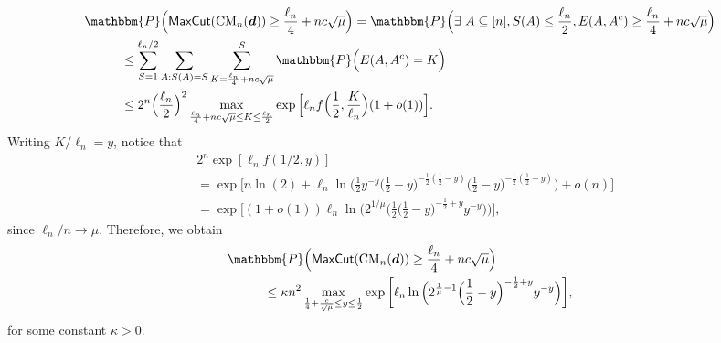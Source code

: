 \documentclass[11pt,a4paper, reqno]{article}
\numberwithin{equation}{section}
\numberwithin{equation}{section}
\newcommand{\PR}{\ensuremath{\mathbbm{P}}}
\newcommand{\1}{\ensuremath{\mathbbm{1}}}
\newcommand{\CM}{\ensuremath{\mathrm{CM}_n(\boldsymbol{d})}}
\newcommand{\Mcut}{{\sf{MaxCut}}}
\numberwithin{equation}{section}
\numberwithin{theorem}{section}
\begin{document}
 \begin{align}
 &\PR\Big(\Mcut(\CM) \geq \frac{\ell_n}{4} + n c \sqrt{\mu}\Big) = \PR\Big(\exists\ A \subseteq[n] , S(A) \leq \frac{\ell_n}{2} , E(A,A^c) \geq \frac{\ell_n}{4} + n c \sqrt{\mu} \Big)  \nonumber\\
 &\hspace{1cm}\leq \sum_{S=1}^{\ell_n/2} \sum_{A: S(A) = S} \sum_{K=\frac{\ell_n}{4}+ n c \sqrt{\mu}}^{S} \PR\Big( E(A,A^c) = K \Big) \nonumber\\ 
%
%
%
&\hspace{1cm}\leq  2^n \Big(\frac{\ell_n}{2} \Big)^2 \max_{ \frac{\ell_n}{4} + n c \sqrt{\mu} \leq K \leq \frac{\ell_n}{2}}  \exp \Big[\ell_n f \Big(\frac{1}{2}, \frac{K}{\ell_n}  \Big) (1+ o(1))\Big] . \nonumber 
 \end{align}
Writing $K/\ell_n = y$,  notice that
 \begin{equation}
  \begin{split}
   &2^n\exp [\ell_n f(1/2,y)] \\
   &=\exp\bigg[n\ln(2)+\ell_n\ln\bigg(\frac{1}{2}y^{-y}\Big(\frac{1}{2}-y\Big)^{-\frac{1}{2}(\frac{1}{2}-y)}\Big(\frac{1}{2}-y\Big)^{-\frac{1}{2}(\frac{1}{2}-y)}\bigg)+o(n)\bigg]\\
   &= \exp\bigg[(1+o(1))\ell_n\ln\bigg(2^{1/\mu}\Big(\frac{1}{2}\Big(\frac{1}{2}-y\Big)^{-\frac{1}{2}+y}y^{-y}\Big)\bigg)\bigg],
  \end{split}
 \end{equation}
since $\ell_n/n\to\mu$. 
Therefore, we obtain
\begin{equation*}
\begin{split}
&\PR\Big(\Mcut(\CM) \geq \frac{\ell_n}{4} + n c \sqrt{\mu}\Big)\\
&\hspace{1cm}\leq \kappa n^2\max_{ \frac{1}{4} + \frac{c}{\sqrt{\mu}} \leq y \leq \frac{1}{2}} \exp\bigg[\ell_n\ln\Big(2^{\frac{1}{\mu}-1}\Big(\frac{1}{2}-y\Big)^{-\frac{1}{2}+y}y^{-y}\Big)\bigg],
\end{split}
\end{equation*}for some constant $\kappa>0$.
\end{document}
